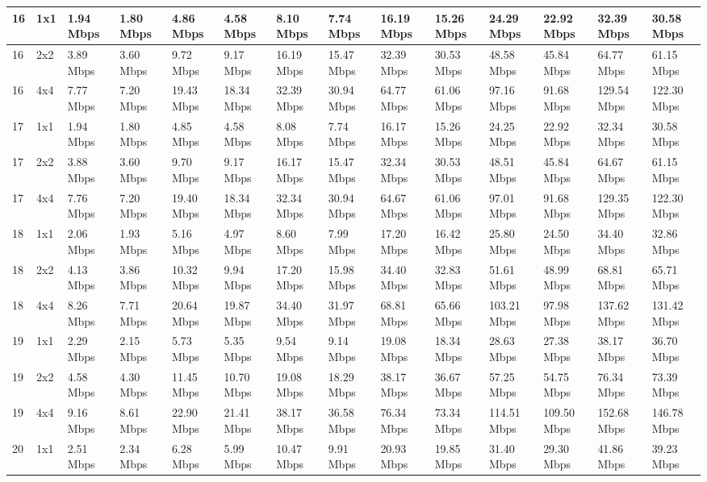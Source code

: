 \documentclass[12pt]{article}
\begin{document}
\begin{longtable}[c]{|l|l|l|l|l|l|l|l|l|l|l|l|l|l|}
16 & 1x1 & 1.94 Mbps & 1.80 Mbps & 4.86 Mbps & 4.58 Mbps & 8.10 Mbps & 7.74 Mbps & 16.19 Mbps & 15.26 Mbps & 24.29 Mbps & 22.92 Mbps & 32.39 Mbps & 30.58 Mbps \\ \hline
16 & 2x2 & 3.89 Mbps & 3.60 Mbps & 9.72 Mbps & 9.17 Mbps & 16.19 Mbps & 15.47 Mbps & 32.39 Mbps & 30.53 Mbps & 48.58 Mbps & 45.84 Mbps & 64.77 Mbps & 61.15 Mbps \\ \hline
16 & 4x4 & 7.77 Mbps & 7.20 Mbps & 19.43 Mbps & 18.34 Mbps & 32.39 Mbps & 30.94 Mbps & 64.77 Mbps & 61.06 Mbps & 97.16 Mbps & 91.68 Mbps & 129.54 Mbps & 122.30 Mbps \\ \hline
17 & 1x1 & 1.94 Mbps & 1.80 Mbps & 4.85 Mbps & 4.58 Mbps & 8.08 Mbps & 7.74 Mbps & 16.17 Mbps & 15.26 Mbps & 24.25 Mbps & 22.92 Mbps & 32.34 Mbps & 30.58 Mbps \\ \hline
17 & 2x2 & 3.88 Mbps & 3.60 Mbps & 9.70 Mbps & 9.17 Mbps & 16.17 Mbps & 15.47 Mbps & 32.34 Mbps & 30.53 Mbps & 48.51 Mbps & 45.84 Mbps & 64.67 Mbps & 61.15 Mbps \\ \hline
17 & 4x4 & 7.76 Mbps & 7.20 Mbps & 19.40 Mbps & 18.34 Mbps & 32.34 Mbps & 30.94 Mbps & 64.67 Mbps & 61.06 Mbps & 97.01 Mbps & 91.68 Mbps & 129.35 Mbps & 122.30 Mbps \\ \hline
18 & 1x1 & 2.06 Mbps & 1.93 Mbps & 5.16 Mbps & 4.97 Mbps & 8.60 Mbps & 7.99 Mbps & 17.20 Mbps & 16.42 Mbps & 25.80 Mbps & 24.50 Mbps & 34.40 Mbps & 32.86 Mbps \\ \hline
18 & 2x2 & 4.13 Mbps & 3.86 Mbps & 10.32 Mbps & 9.94 Mbps & 17.20 Mbps & 15.98 Mbps & 34.40 Mbps & 32.83 Mbps & 51.61 Mbps & 48.99 Mbps & 68.81 Mbps & 65.71 Mbps \\ \hline
18 & 4x4 & 8.26 Mbps & 7.71 Mbps & 20.64 Mbps & 19.87 Mbps & 34.40 Mbps & 31.97 Mbps & 68.81 Mbps & 65.66 Mbps & 103.21 Mbps & 97.98 Mbps & 137.62 Mbps & 131.42 Mbps \\ \hline
19 & 1x1 & 2.29 Mbps & 2.15 Mbps & 5.73 Mbps & 5.35 Mbps & 9.54 Mbps & 9.14 Mbps & 19.08 Mbps & 18.34 Mbps & 28.63 Mbps & 27.38 Mbps & 38.17 Mbps & 36.70 Mbps \\ \hline
19 & 2x2 & 4.58 Mbps & 4.30 Mbps & 11.45 Mbps & 10.70 Mbps & 19.08 Mbps & 18.29 Mbps & 38.17 Mbps & 36.67 Mbps & 57.25 Mbps & 54.75 Mbps & 76.34 Mbps & 73.39 Mbps \\ \hline
19 & 4x4 & 9.16 Mbps & 8.61 Mbps & 22.90 Mbps & 21.41 Mbps & 38.17 Mbps & 36.58 Mbps & 76.34 Mbps & 73.34 Mbps & 114.51 Mbps & 109.50 Mbps & 152.68 Mbps & 146.78 Mbps \\ \hline
20 & 1x1 & 2.51 Mbps & 2.34 Mbps & 6.28 Mbps & 5.99 Mbps & 10.47 Mbps & 9.91 Mbps & 20.93 Mbps & 19.85 Mbps & 31.40 Mbps & 29.30 Mbps & 41.86 Mbps & 39.23 Mbps \\ \hline

\end{longtable}
\end{document}
